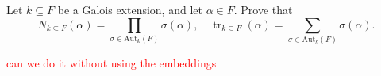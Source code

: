\documentclass[openany]{book}
\begin{document}
\begin{prob}
Let $k \subseteq F$ be a Galois extension, and let $\alpha \in F$. Prove that
\[ N_{k \subseteq F}(\alpha) = \prod_{\sigma \in \text{Aut}_k(F)} \sigma(\alpha), \quad \operatorname{tr}_{k \subseteq F}(\alpha) = \sum_{\sigma \in \text{Aut}_k(F)} \sigma(\alpha). \]
\end{prob}
\textcolor{red}{can we do it without using the embeddings}


\end{document}
